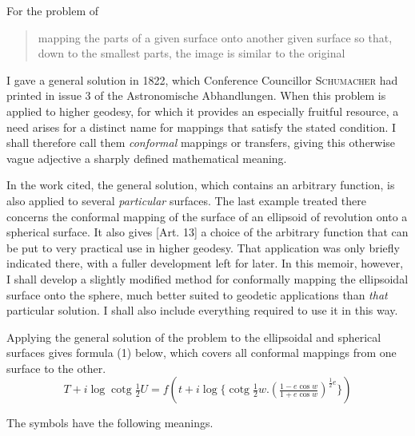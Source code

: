 \indent For the problem of
\begin{quote}
mapping the parts of a given surface onto another given surface so that, down to the smallest parts, the image is similar to the original
\end{quote}
\noindent I gave a general solution in 1822, which Conference Councillor \textsc{Schumacher} had printed in issue 3 of the Astronomische Abhandlungen. When this problem is applied to higher geodesy, for which it provides an especially fruitful resource, a need arises for a distinct name for mappings that satisfy the stated condition. I shall therefore call them \textit{conformal} mappings or transfers, giving this otherwise vague adjective a sharply defined mathematical meaning.

In the work cited, the general solution, which contains an arbitrary function, is also applied to several \textit{particular} surfaces. The last example treated there concerns the conformal mapping of the surface of an ellipsoid of revolution onto a spherical surface. It also gives [Art. 13] a choice of the arbitrary function that can be put to very practical use in higher geodesy. That application was only briefly indicated there, with a fuller development left for later. In this memoir, however, I shall develop a slightly modified method for conformally mapping the ellipsoidal surface onto the sphere, much better suited to geodetic applications than \textit{that} particular solution. I shall also include everything required to use it in this way.

\indent Applying the general solution of the problem to the ellipsoidal and spherical surfaces gives formula (1) below, which covers all conformal mappings from one surface to the other.
\[
T+i\log\operatorname{cotg}\tfrac{1}{2}U=f(t+i\log\{\operatorname{cotg}\tfrac{1}{2}w\mathord{.}(\tfrac{1-e\cos w}{1+e\cos w})^{\frac{1}{2}e}\})
\]

The symbols have the following meanings.
